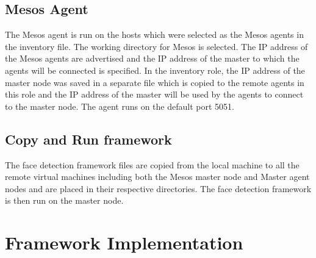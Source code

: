 \documentclass[9pt,twocolumn,twoside]{../../styles/osajnl}
\begin{document}
\subsection{Mesos Agent}
The Mesos agent is run on the hosts which were selected as the Mesos
agents in the inventory file. The working directory for Mesos is
selected.  The IP address of the Mesos agents are advertised and the
IP address of the master to which the agents will be connected is
specified. In the inventory role, the IP address of the master node
was saved in a separate file which is copied to the remote agents in
this role and the IP address of the master will be used by the agents
to connect to the master node. The agent runs on the default port
5051.

\subsection{Copy and Run framework}
The face detection framework files are copied from the local machine
to all the remote virtual machines including both the Mesos master
node and Master agent nodes and are placed in their respective
directories. The face detection framework is then run on the master node.

\section{Framework Implementation}
\end{document}
